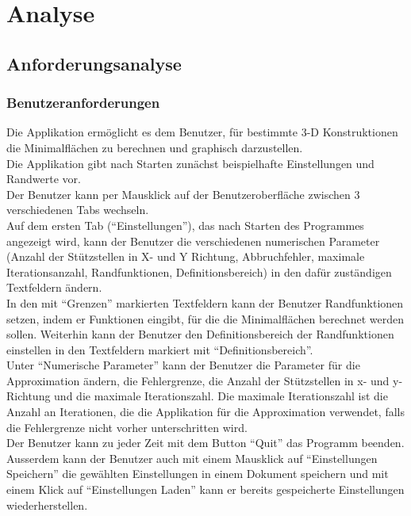 \chapter{Analyse}
\label{ch:2}

\section{Anforderungsanalyse}
\label{sec:2.1}

\subsection{Benutzeranforderungen}

Die Applikation erm\"oglicht es dem Benutzer, f\"ur bestimmte 3-D Konstruktionen die Minimalfl\"achen zu berechnen und graphisch darzustellen.\\
Die Applikation gibt nach Starten zun\"achst beispielhafte Einstellungen und Randwerte vor.\\
Der Benutzer kann per Mausklick auf der Benutzeroberfl\"ache zwischen 3 verschiedenen Tabs wechseln.\\
Auf dem ersten Tab ("`Einstellungen"'), das nach Starten des Programmes angezeigt wird, kann der Benutzer die verschiedenen numerischen Parameter (Anzahl der St\"utzstellen in X- und Y Richtung,  Abbruchfehler, maximale Iterationsanzahl, Randfunktionen, Definitionsbereich) in den daf\"ur zust\"andigen Textfeldern \"andern.\\
In den mit "`Grenzen"'  markierten Textfeldern kann der Benutzer Randfunktionen setzen, indem er Funktionen eingibt, f\"ur die die Minimalfl\"achen berechnet werden sollen. Weiterhin kann der Benutzer den Definitionsbereich der Randfunktionen einstellen in den Textfeldern markiert mit "`Definitionsbereich"'.\\
Unter "`Numerische Parameter"'  kann der Benutzer die Parameter f\"ur die Approximation \"andern, die Fehlergrenze, die Anzahl der St\"utzstellen in x- und y- Richtung und die maximale Iterationszahl.
Die maximale Iterationszahl ist die Anzahl an Iterationen, die die Applikation f\"ur die Approximation verwendet, falls die Fehlergrenze nicht vorher unterschritten wird.\\
Der Benutzer kann zu jeder Zeit  mit dem Button "`Quit"' das Programm beenden. \\
Ausserdem kann der Benutzer auch mit einem Mausklick auf "`Einstellungen Speichern"' die gew\"ahlten Einstellungen in einem Dokument speichern und mit einem Klick auf "`Einstellungen Laden"' kann er bereits gespeicherte Einstellungen wiederherstellen.\\
